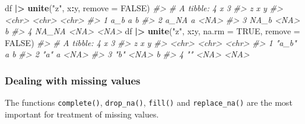 \documentclass[
]{book}
\newenvironment{Shaded}{\begin{snugshade}}{\end{snugshade}}
\newcommand{\AttributeTok}[1]{\textcolor[rgb]{0.13,0.29,0.53}{#1}}
\newcommand{\CommentTok}[1]{\textcolor[rgb]{0.56,0.35,0.01}{\textit{#1}}}
\newcommand{\ConstantTok}[1]{\textcolor[rgb]{0.56,0.35,0.01}{#1}}
\newcommand{\FunctionTok}[1]{\textcolor[rgb]{0.13,0.29,0.53}{\textbf{#1}}}
\newcommand{\NormalTok}[1]{#1}
\newcommand{\SpecialCharTok}[1]{\textcolor[rgb]{0.81,0.36,0.00}{\textbf{#1}}}
\newcommand{\StringTok}[1]{\textcolor[rgb]{0.31,0.60,0.02}{#1}}
\begin{document}
\begin{Shaded}
\begin{Highlighting}[]
\NormalTok{  df }\SpecialCharTok{|\textgreater{}} \FunctionTok{unite}\NormalTok{(}\StringTok{"z"}\NormalTok{, x}\SpecialCharTok{:}\NormalTok{y, }\AttributeTok{remove =} \ConstantTok{FALSE}\NormalTok{)}
\CommentTok{\#\textgreater{} \# A tibble: 4 x 3}
\CommentTok{\#\textgreater{}   z     x     y    }
\CommentTok{\#\textgreater{}   \textless{}chr\textgreater{} \textless{}chr\textgreater{} \textless{}chr\textgreater{}}
\CommentTok{\#\textgreater{} 1 a\_b   a     b    }
\CommentTok{\#\textgreater{} 2 a\_NA  a     \textless{}NA\textgreater{} }
\CommentTok{\#\textgreater{} 3 NA\_b  \textless{}NA\textgreater{}  b    }
\CommentTok{\#\textgreater{} 4 NA\_NA \textless{}NA\textgreater{}  \textless{}NA\textgreater{}}
\NormalTok{  df }\SpecialCharTok{|\textgreater{}} \FunctionTok{unite}\NormalTok{(}\StringTok{"z"}\NormalTok{, x}\SpecialCharTok{:}\NormalTok{y, }\AttributeTok{na.rm =} \ConstantTok{TRUE}\NormalTok{, }\AttributeTok{remove =} \ConstantTok{FALSE}\NormalTok{)}
\CommentTok{\#\textgreater{} \# A tibble: 4 x 3}
\CommentTok{\#\textgreater{}   z     x     y    }
\CommentTok{\#\textgreater{}   \textless{}chr\textgreater{} \textless{}chr\textgreater{} \textless{}chr\textgreater{}}
\CommentTok{\#\textgreater{} 1 "a\_b" a     b    }
\CommentTok{\#\textgreater{} 2 "a"   a     \textless{}NA\textgreater{} }
\CommentTok{\#\textgreater{} 3 "b"   \textless{}NA\textgreater{}  b    }
\CommentTok{\#\textgreater{} 4 ""    \textless{}NA\textgreater{}  \textless{}NA\textgreater{}}
\end{Highlighting}
\end{Shaded}

\subsubsection{Dealing with missing values}\label{dealing-with-missing-values}

The functions \texttt{complete()}, \texttt{drop\_na()}, \texttt{fill()} and \texttt{replace\_na()} are the most important for treatment of missing values.
\end{document}
